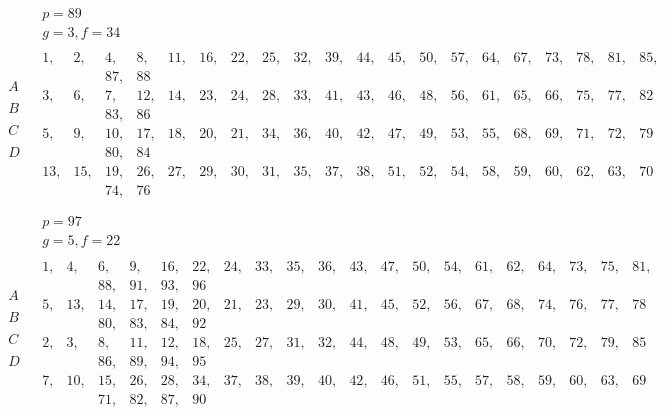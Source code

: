 \documentclass[twoside,12pt]{memoir}
\begin{document}
\[\begin{aligned}
& \begin{array}{c} p=89 \\  g=3, f=34 \end{array} \\
\begin{array}{l} A \\  \\ B \\ \\ C \\ \\ D \\ \\ \end{array} & 
\begin{array}{|rrrrrrrrrrrrrrrrrrrrrr} 
1,&2,&4,&8,&11,&16,&22,&25,&32,&39,&44,&45,&50,&57,&64,&67,&73,&78,&81,&85,\\
&&87,&88 \\ 
3,&6,&7,& 12,&14,&23,&24,&28,&33,&41,&43,&46,&48,&56,&61,&65,&66,&75,&77,&82 \\ 
&&83,&86 \\
5,& 9,& 10,&17,&18,&20,&21,&34,&36,&40,&42,&47,&49,&53,&55,&68,&69,&71,&72,&79 \\ 
&&80,&84&\\
13,&15,&19,&26,&27,&29,& 30,&31,&35,&37,&38,&51,&52,&54,&58,&59,&60,&62,&63,&70 \\
&&74,&76
\end{array} \\ \end{aligned}\]
\[\begin{aligned}
& \begin{array}{c} p=97 \\  g=5, f=22 \end{array} \\
\begin{array}{l} A \\  \\ B \\ \\ C \\ \\ D \\ \\ \end{array} & 
\begin{array}{|rrrrrrrrrrrrrrrrrrrrrr} 
1,&4,&6,&9,&16,&22,&24,&33,&35,&36,&43,&47,&50,&54,&61,&62,&64,&73,&75,&81,\\
&&88,&91,&93,&96 \\ 
5,&13,&14,& 17,&19,&20,&21,&23,&29,&30,&41,&45,&52,&56,&67,&68,&74,&76,&77,&78 \\ 
&&80,&83,&84,&92 \\
2,& 3,& 8,&11,&12,&18,&25,&27,&31,&32,&44,&48,&49,&53,&65,&66,&70,&72,&79,&85 \\ 
&&86,&89,&94,&95\\
7,&10,&15,&26,&28,&34,& 37,&38,&39,&40,&42,&46,&51,&55,&57,&58,&59,&60,&63,&69 \\
&&71,&82,&87,&90
\end{array} 
\end{aligned}\]
\end{document}
